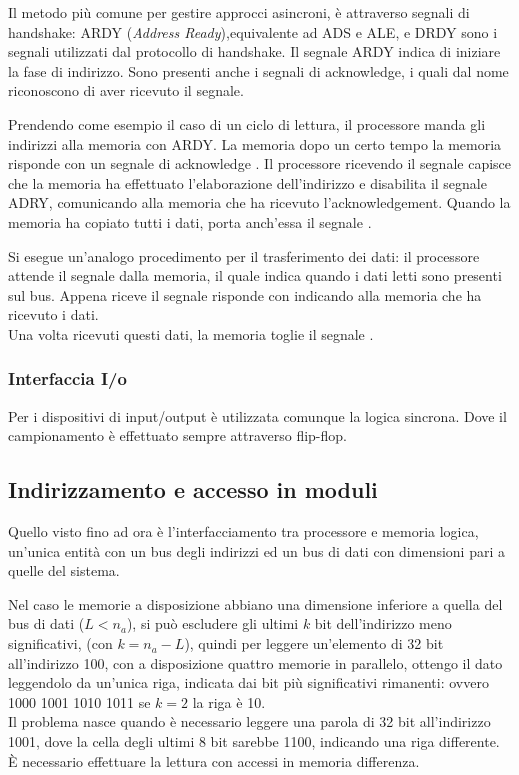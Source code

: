 \documentclass[../template]{subfiles}
\begin{document}
Il metodo più comune per gestire approcci asincroni, è attraverso segnali di handshake:
ARDY (\textit{Address Ready}),equivalente ad ADS e ALE, e DRDY sono i segnali utilizzati dal protocollo di handshake.
Il segnale ARDY indica di iniziare la fase di indirizzo.
Sono presenti anche i segnali di acknowledge, i quali dal nome riconoscono di aver ricevuto il segnale.

Prendendo come esempio il caso di un ciclo di lettura, il processore manda gli indirizzi alla memoria con ARDY. La memoria dopo un certo tempo la memoria risponde con un segnale di acknowledge .
Il processore ricevendo il segnale  capisce che la memoria ha effettuato l'elaborazione dell'indirizzo e disabilita il segnale ADRY, comunicando alla memoria che ha ricevuto l'acknowledgement.
Quando la memoria ha copiato tutti i dati, porta anch'essa il segnale .

Si esegue un'analogo procedimento per il trasferimento dei dati: il processore attende il segnale  dalla memoria, il quale indica quando i dati letti sono presenti sul bus. Appena riceve il segnale risponde con  indicando alla memoria che ha ricevuto i dati.
\\
Una volta ricevuti questi dati, la memoria toglie il segnale .
\subsubsection{Interfaccia I/o}
Per i dispositivi di input/output è utilizzata comunque la logica sincrona. Dove il campionamento è effettuato sempre attraverso flip-flop.

\subsection{Indirizzamento e accesso in moduli}
Quello visto fino ad ora è l'interfacciamento tra processore e memoria logica, un'unica entità con un bus degli indirizzi ed un bus di dati con dimensioni pari a quelle del sistema.

Nel caso le memorie a disposizione abbiano una dimensione inferiore a quella del bus di dati ($L < n_a$), si può escludere gli ultimi $k$ bit dell'indirizzo meno significativi, (con $k = n_a - L$), quindi per leggere un'elemento di 32 bit all'indirizzo 100, con a disposizione quattro memorie in parallelo, ottengo il dato leggendolo da un'unica riga, indicata dai bit più significativi rimanenti: ovvero 1000 1001 1010 1011 se $k = 2$ la riga è 10.
\\
Il problema nasce quando è necessario leggere una parola di 32 bit all'indirizzo 1001, dove la cella degli ultimi 8 bit sarebbe 1100, indicando una riga differente. È necessario effettuare la lettura con accessi in memoria differenza.
\end{document}
